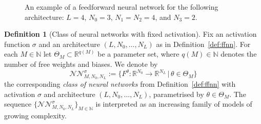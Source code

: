 \documentclass[12pt,a4paper]{article}
\theoremstyle{definition}
\newtheorem{definition}{Definition}[section]
\theoremstyle{plain}
\theoremstyle{remark}
\theoremstyle{plain}
\begin{document}
\begin{figure}[h!]
\centering
{}

\caption{An example of a feedforward neural network for the following architecture:
$L = 4$, $N_0 = 3$, $N_1 = N_2 = 4$, and $N_3 = 2$.}
\label{fig:ffnn_tikz}
\end{figure}

\begin{definition}[Class of neural networks with fixed activation]
\label{def:NN_class}
Fix an activation function $\sigma$ and an architecture $(L,N_0,\dots,N_L)$ as in Definition~\ref{def:ffnn}. 
For each $M\in\mathbb N$ let $\Theta_M\subset\mathbb R^{q(M)}$ be a parameter set, where $q(M)\in\mathbb N$ denotes the number of free weights and biases. 
We denote by
\[
    \mathcal{NN}^{\sigma}_{M,N_0,N_L}
    :=
    \bigl\{ F^\theta : \mathbb R^{N_0}\to\mathbb R^{N_L} \,\big|\, \theta\in\Theta_M \bigr\}
\]
the corresponding \emph{class of neural networks} from Definition~\ref{def:ffnn} with activation $\sigma$ and architecture $(L,N_0,\dots,N_L)$, parametrised by $\theta\in\Theta_M$. 
The sequence $\{\mathcal{NN}^\sigma_{M,N_0,N_L}\}_{M\in\mathbb N}$ is interpreted as an increasing family of models of growing complexity.
\end{definition}
\end{document}
